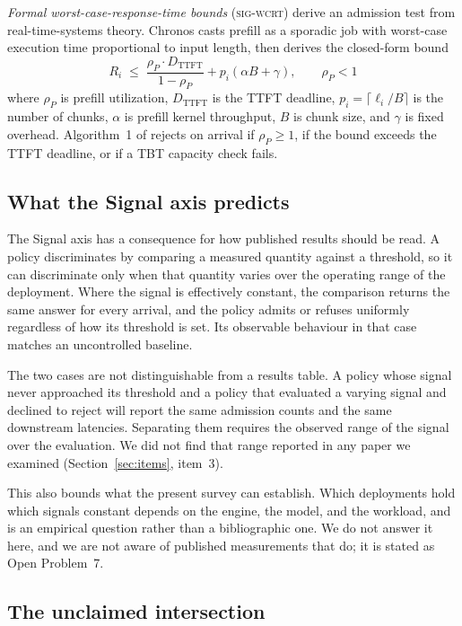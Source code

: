 \documentclass[10pt]{article} %
\theoremstyle{definition}
\begin{document}
\textit{Formal worst-case-response-time bounds} (\textsc{sig-wcrt})
derive an admission test from real-time-systems theory. Chronos casts prefill as a
sporadic job with worst-case execution time proportional to input
length, then derives the closed-form bound
%
\begin{equation}
R_i \;\le\; \frac{\rho_P \cdot D_{\text{TTFT}}}{1 - \rho_P} + p_i(\alpha B + \gamma), \qquad \rho_P < 1
\label{eq:chronos-wcrt}
\end{equation}
%
where $\rho_P$ is prefill utilization, $D_{\text{TTFT}}$ is the TTFT
deadline, $p_i = \lceil \ell_i / B \rceil$ is the number of chunks,
$\alpha$ is prefill kernel throughput, $B$ is chunk size, and $\gamma$
is fixed overhead. Algorithm~1 of \citep{marref2026chronos} rejects on
arrival if $\rho_P \ge 1$, if the bound exceeds the TTFT deadline, or
if a TBT capacity check fails.

\subsection{What the Signal axis predicts}
\label{sec:signal-predicts}

The Signal axis has a consequence for how published results should be
read. A policy discriminates by comparing a measured quantity against a
threshold, so it can discriminate only when that quantity varies over
the operating range of the deployment. Where the signal is effectively
constant, the comparison returns the same answer for every arrival, and
the policy admits or refuses uniformly regardless of how its threshold
is set. Its observable behaviour in that case matches an uncontrolled
baseline.

The two cases are not distinguishable from a results table. A policy
whose signal never approached its threshold and a policy that evaluated
a varying signal and declined to reject will report the same admission
counts and the same downstream latencies. Separating them requires the
observed range of the signal over the evaluation. We did not find that
range reported in any paper we examined (Section~\ref{sec:items},
item~3).

This also bounds what the present survey can establish. Which
deployments hold which signals constant depends on the engine, the
model, and the workload, and is an empirical question rather than a
bibliographic one. We do not answer it here, and we are not aware of
published measurements that do; it is stated as Open Problem~7.

\subsection{The unclaimed intersection}
\end{document}
